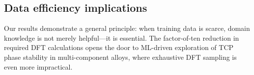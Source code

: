\subsection{Data efficiency implications}

Our results demonstrate a general principle: when training data is scarce, domain knowledge is not merely helpful---it is essential. The factor-of-ten reduction in required DFT calculations opens the door to ML-driven exploration of TCP phase stability in multi-component alloys, where exhaustive DFT sampling is even more impractical.
